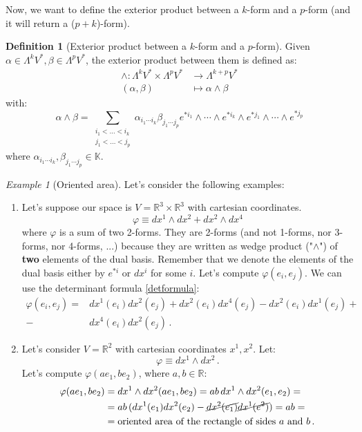 \documentclass[a4paper,11pt,titlepage, article, oneside]{memoir}
\numberwithin{equation}{section}
\theoremstyle{definition}
\newtheorem{definition}[theorem]{Definition}
\theoremstyle{remark}
\newtheorem{example}[theorem]{Example}
\newcommand{\rfield}{\mathbb{R}}
\begin{document}
Now, we want to define the exterior product between a $k$-form and a $p$-form (and it will return a ($p+k$)-form).

\begin{definition}[Exterior product between a $k$-form and a $p$-form]
  Given $\alpha \in \Lambda ^k V^*, \beta \in \Lambda^p V^*$, the exterior product between them is defined as:
  \begin{align}
    \wedge \colon \Lambda ^k V^* \times \Lambda ^p V^* &\rightarrow \Lambda^{k+p} V^* \nonumber \\
    (\alpha, \beta) &\mapsto \alpha \wedge \beta \nonumber
  \end{align}
  with:
  $$\alpha \wedge \beta = \sum\limits_{\substack{i_1 < \ldots < i_k \\ j_1 < \ldots < j_p}} \alpha_{i_1 \cdots i_k}\beta_{j_1 \cdots j_p} e^{*i_1} \wedge \cdots \wedge e^{*i_k} \wedge e^{*j_1} \wedge \cdots \wedge e^{*j_p} $$
  where $\alpha_{i_1 \cdots i_k},\beta_{j_1 \cdots j_p} \in \mathbb{K}$.
\end{definition}


\begin{tcolorbox}\begin{example}[Oriented area] \label{orarea}
  Let's consider the following examples:
  \begin{enumerate}
    \item Let's suppose our space is $V = \rfield^3 \times \rfield^3$ with cartesian coordinates.
    $$\varphi \equiv dx^1 \wedge dx^2 + dx^2 \wedge dx^4$$
    where $\varphi$ is a sum of two 2-forms. They are 2-forms (and not 1-forms, nor 3-forms, nor 4-forms, ...) because they are written as wedge product ("$\wedge$") of \textbf{two} elements of the dual basis. Remember that we denote the elements of the dual basis either by $e^{*i}$ or $dx^i$ for some $i$.
    Let's compute $\varphi(e_i, e_j)$. We can use the determinant formula \eqref{detformula}:
\begin{align*}
    \varphi(e_i, e_j) = &dx^1(e_i) dx^2(e_j) + dx^2(e_i)dx^4(e_j) - dx^2(e_i)dx^1(e_j) + \\ - &dx^4(e_i)dx^2(e_j)\, .
    \end{align*}
    \item Let's consider $V = \rfield^2$ with cartesian coordinates $x^1, x^2$. Let:
    $$\varphi \equiv dx^1 \wedge dx^2\, .$$
    Let's compute $\varphi(ae_1, be_2)$, where $ a,b \in \rfield$:
    \begin{align*}
    \varphi(ae_1, be_2) &= dx^1 \wedge dx^2(ae_1, be_2) = ab\,  dx^1 \wedge dx^2(e_1, e_2) = \\
    &= ab \, (dx^1(e_1)dx^2(e_2) - \cancel{dx^2(e_1)} \cancel{dx^1(e^2)}) = ab = \\
    &= \text{oriented area of the rectangle of sides } a \text{ and } b\, .
  \end{align*}
  \end{enumerate}

\end{example}\end{tcolorbox}
\end{document}
